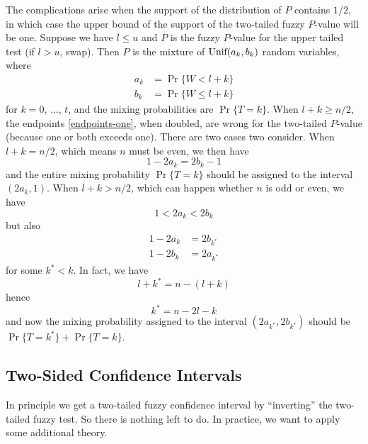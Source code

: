 \documentclass{article}
\newcommand{\UniformDis}{\text{\upshape Unif}}
\begin{document}
The complications arise when the support of the distribution of $P$ contains
$1 / 2$, in which case the upper bound of the support of the two-tailed
fuzzy $P$-value will be one.  Suppose we have $l \le u$ and $P$ is the fuzzy
$P$-value for the upper tailed test (if $l > u$, swap).  Then $P$
is the mixture of $\UniformDis(a_k, b_k)$ random variables, where
\begin{equation} \label{endpoints-one}
\begin{split}
   a_k & = \Pr\{ W < l + k \}
   \\
   b_k & = \Pr\{ W \le l + k \}
\end{split}
\end{equation}
for $k = 0$, $\ldots$, $t$, and the mixing probabilities
are $\Pr\{ T = k \}$.  When $l + k \ge n / 2$, the endpoints
\eqref{endpoints-one}, when doubled, are wrong for the two-tailed $P$-value
(because one or both exceeds one).  There are two cases two consider.
When $l + k = n / 2$, which means $n$ must be even, we then have
$$
   1 - 2 a_k = 2 b_k - 1
$$
and the entire mixing probability $\Pr\{ T = k \}$ should be assigned
to the interval $(2 a_k, 1)$.
When $l + k > n / 2$, which can happen whether $n$ is odd or even, we have
$$
   1 < 2 a_k < 2 b_k
$$
but also
\begin{align*}
   1 - 2 a_k & = 2 b_{k^*}
   \\
   1 - 2 b_k & = 2 a_{k^*}
\end{align*}
for some $k^* < k$.  In fact, we have
$$
   l + k^* = n - (l + k)
$$
hence
$$
   k^* = n - 2 l - k
$$
and now the mixing probability assigned to the
interval $(2 a_{k^*}, 2 b_{k^*})$ should be
$\Pr\{ T = k^* \} + \Pr\{ T = k \}$.

\subsection{Two-Sided Confidence Intervals}

In principle we get a two-tailed fuzzy confidence interval by ``inverting''
the two-tailed fuzzy test.  So there is nothing left to do.
In practice, we want to apply some additional theory.
\end{document}
